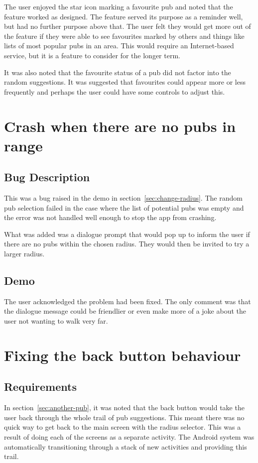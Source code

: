 \documentclass{report}
\begin{document}
The user enjoyed the star icon marking a favourite pub and noted
that the feature worked as designed. The feature served its purpose
as a reminder well, but had no further purpose above that. The user
felt they would get more out of the feature if they were able to see
favourites marked by others and things like lists of most popular
pubs in an area. This would require an Internet-based service, but
it is a feature to consider for the longer term.

It was also noted that the favourite status of a pub did not factor
into the random suggestions. It was suggested that favourites could
appear more or less frequently and perhaps the user could have some
controls to adjust this.

\section{Crash when there are no pubs in range}
\subsection{Bug Description}

This was a bug raised in the demo in section~\ref{sec:change-radius}.
The random pub selection failed in the case where the list of
potential pubs was empty and the error was not handled well enough
to stop the app from crashing.

What was added was a dialogue prompt that would pop up to inform
the user if there are no pubs within the chosen radius. They would
then be invited to try a larger radius.

\subsection{Demo}

The user acknowledged the problem had been fixed. The only comment
was that the dialogue message could be friendlier or even make
more of a joke about the user not wanting to walk very far.

\section{Fixing the back button behaviour}

\subsection{Requirements}
In section~\ref{sec:another-pub}, it was noted that the back button
would take the user back through the whole trail of pub suggestions.
This meant there was no quick way to get back to the main
screen with the radius selector. This was a result of doing each
of the screens as a separate activity. The Android system was
automatically transitioning through a stack of new activities
and providing this trail.
\end{document}
